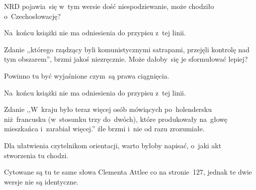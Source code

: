 \documentclass[a4paper,11pt]{article}
\begin{document}
\vspace{\spaceFour}


\start {} NRD pojawia~się w~tym wersie dość
niespodziewanie, może chodziło o~Czechosłowację?

\vspace{\spaceFour}


\start {} Na~końcu książki nie ma odniesienia do przypisu
z~tej linii.

\vspace{\spaceFour}


\start {} Zdanie ,,którego rządzący byli
komunistycznymi satrapami, przejęli kontrolę nad tym obszarem'', brzmi
jakoś niezręcznie. Może dałoby~się je sformułować lepiej?

\vspace{\spaceFour}


\start {} Powinno tu być wyjaśnione czym~są prawa
ciągnięcia.

\vspace{\spaceFour}


\start {} Na~końcu książki nie ma odniesienia do przypisu
z~tej linii.

\vspace{\spaceFour}


\start {} Zdanie ,,W~kraju było teraz więcej osób
mówiących po~holendersku niż~francusku (w~stosunku trzy do~dwóch),
które produkowały na~głowę mieszkańca i~zarabiał więcej.'' źle brzmi
i~nie od razu zrozumiałe.

\vspace{\spaceFour}


\start {} Dla ułatwienia czytelnikom
orientacji, warto byłoby napisać, o~jaki akt stworzenia tu chodzi.

\vspace{\spaceFour}


\start {} Cytowane są tu te same słowa
Clementa Attlee co na stronie~127, jednak te dwie wersje nie są
identyczne.



\nopagebreak
\end{document}
